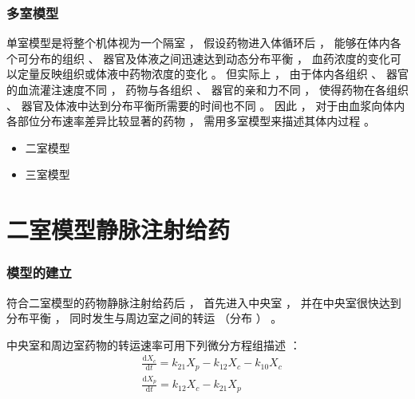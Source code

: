\documentclass[dvipsnames, svgnames, x11names]{beamer}
\begin{document}
\begin{frame}{}
	\begin{center}
		{\Huge {}}
	\end{center}
	\tableofcontents[subsectionstyle=hide/hide/show]
	\thispagestyle{empty}
	\addtocounter{framenumber}{-1}
\end{frame}

\begin{frame}
    \frametitle{多室模型}
    单室模型是将整个机体视为一个隔室 ， 假设药物进入体循环后 ， 能够在体内各个可分布的组织 、 器官及体液之间迅速达到动态分布平衡 ， 血药浓度的变化可以定量反映组织或体液中药物浓度的变化 。 但实际上 ， 由于体内各组织 、 器官的血流灌注速度不同 ， 药物与各组织 、 器官的亲和力不同 ， 使得药物在各组织 、 器官及体液中达到分布平衡所需要的时间也不同 。 因此 ， 对于由血浆向体内各部位分布速率差异比较显著的药物 ， 需用多室模型来描述其体内过程 。
    
    \begin{itemize}
      \item 二室模型
      \item 三室模型
    \end{itemize}
    
\end{frame}


\section{二室模型静脉注射给药}


\begin{frame}
    \frametitle{模型的建立}
    符合二室模型的药物静脉注射给药后 ， 首先进入中央室 ， 并在中央室很快达到分布平衡 ， 同时发生与周边室之间的转运 （分布 ） 。

    \begin{center}
    \end{center}
    中央室和周边室药物的转运速率可用下列微分方程组描述 ：
    \[
        \begin{aligned}
            &\frac{\mathrm{d}X_{c}}{\mathrm{d}t} =k_{21}X_{p}-k_{{12}}X_{c}-k_{{10}}X_{c}  \\
            &\frac{\mathrm{d}X_{p}}{\mathrm{d}t} =k_{{12}}X_{c}-k_{{21}}X_{p} 
        \end{aligned}
    \]

\end{frame}
\end{document}
